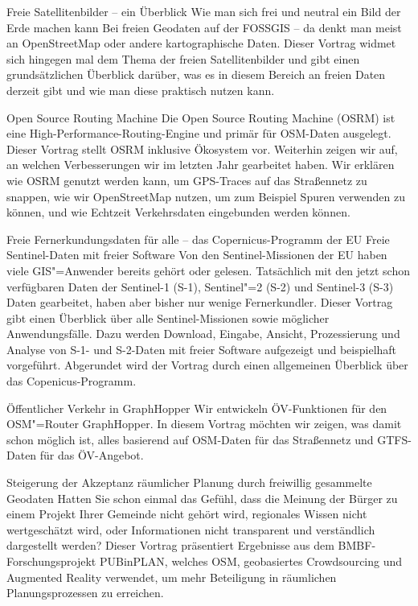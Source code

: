 \renewcommand{\konferenztag}{\freitag}
%
{Freie Satellitenbilder -- ein Überblick}%
{Wie man sich frei und neutral ein Bild der Erde machen kann}%
{Bei freien Geodaten auf der FOSSGIS -- da denkt man meist an OpenStreetMap oder andere
kartographische Daten. Dieser Vortrag widmet sich hingegen mal dem Thema der freien Satellitenbilder
und gibt einen grundsätzlichen Überblick darüber, was es in diesem Bereich an freien Daten derzeit
gibt und wie man diese praktisch nutzen kann.}


%
{Open Source Routing Machine}%
{}
{Die Open Source Routing Machine (OSRM) ist eine High-Performance-Routing-Engine und primär für
  OSM-Daten ausgelegt. Dieser Vortrag stellt OSRM inklusive Ökosystem vor. Weiterhin
  zeigen wir auf, an welchen Verbesserungen wir im letzten Jahr gearbeitet haben. Wir erklären wie
  OSRM genutzt werden kann, um GPS-Traces auf das Straßennetz zu snappen, wie wir OpenStreetMap
  nutzen, um zum Beispiel Spuren verwenden zu können, und wie Echtzeit Verkehrsdaten eingebunden
werden können.}

%
{Freie Fernerkundungsdaten für alle – das Copernicus-Programm der EU}%
{Freie Sentinel-Daten mit freier Software}%
{Von den Sentinel-Missionen der EU haben viele GIS"=Anwender bereits gehört oder gelesen. Tatsächlich
mit den jetzt schon verfügbaren Daten der Sentinel-1 (S-1), Sentinel"=2 (S-2) und Sentinel-3 (S-3)
Daten gearbeitet, haben aber bisher nur wenige Fernerkundler. Dieser Vortrag gibt einen Überblick
über alle Sentinel-Missionen sowie möglicher Anwendungsfälle. Dazu werden Download, Eingabe,
Ansicht, Prozessierung und Analyse von S-1- und S-2-Daten mit freier Software aufgezeigt und
beispielhaft vorgeführt. Abgerundet wird der Vortrag durch einen allgemeinen Überblick über das
Copenicus-Programm.}



%
{Öffentlicher Verkehr in GraphHopper}%
{}%
{Wir entwickeln ÖV-Funktionen für den OSM"=Router GraphHopper. In diesem Vortrag möchten
wir zeigen, was damit schon möglich ist, alles basierend auf OSM-Daten für das Straßennetz und
GTFS-Daten für das ÖV-Angebot.}

%
{Steigerung der Akzeptanz räumlicher Planung durch freiwillig gesammelte Geodaten}%
{}%
{Hatten Sie schon einmal das Gefühl, dass die Meinung der Bürger zu einem Projekt Ihrer Gemeinde
nicht gehört wird, regionales Wissen nicht wertgeschätzt wird, oder Informationen nicht transparent
und verständlich dargestellt werden? Dieser Vortrag präsentiert Ergebnisse aus dem
BMBF-Forschungsprojekt PUBinPLAN, welches OSM, geobasiertes Crowdsourcing und Augmented
Reality verwendet, um mehr Beteiligung in räumlichen Planungsprozessen zu erreichen. }


